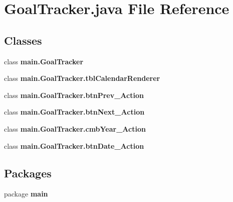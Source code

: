 \section{Goal\+Tracker.\+java File Reference}
\label{_goal_tracker_8java}
\subsection*{Classes}
\begin{DoxyCompactItemize}
\item 
class \textbf{ main.\+Goal\+Tracker}
\item 
class {\bfseries main.\+Goal\+Tracker.\+tbl\+Calendar\+Renderer}
\item 
class {\bfseries main.\+Goal\+Tracker.\+btn\+Prev\+\_\+\+Action}
\item 
class {\bfseries main.\+Goal\+Tracker.\+btn\+Next\+\_\+\+Action}
\item 
class {\bfseries main.\+Goal\+Tracker.\+cmb\+Year\+\_\+\+Action}
\item 
class {\bfseries main.\+Goal\+Tracker.\+btn\+Date\+\_\+\+Action}
\end{DoxyCompactItemize}
\subsection*{Packages}
\begin{DoxyCompactItemize}
\item 
package \textbf{ main}
\end{DoxyCompactItemize}
